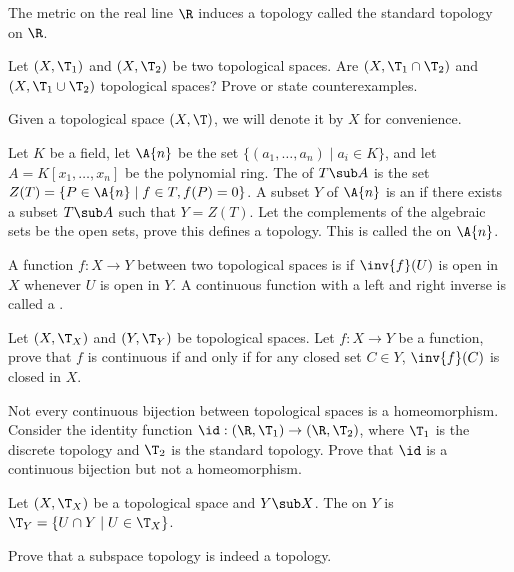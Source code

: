 \documentclass[10pt]{article}
\begin{document}
\par
The metric on the real line $\R$ induces a topology called the standard topology on $\R$.
\begin{problem}
    Let $(X,{\T}_{1})$ and $(X,{\T}_{2})$ be two topological spaces. Are $(X,{\T}_{1}\cap{\T}_{2})$ and $(X,{\T}_{1}\cup{\T}_{2})$ topological spaces? Prove or state counterexamples.
\end{problem}
\begin{remark}
    Given a topological space $(X,\T)$, we will denote it by $X$ for convenience.
\end{remark}
\begin{problem}
    Let $K$ be a field, let $\A{n}$ be the set $\{({a}_{1},\dots,{a}_{n})\mid{a}_{i}\in K\}$, and let $A=K[{x}_{1},\dots,{x}_{n}]$ be the polynomial ring. The  of $T\sub A$ is the set $Z(T)=\{P\in\A{n}\mid f\in T,f(P)=0\}$. A subset $Y$ of $\A{n}$ is an  if there exists a subset $T\sub A$ such that $Y=Z(T)$. Let the complements of the algebraic sets be the open sets, prove this defines a topology. This is called the  on $\A{n}$.
\end{problem}
\begin{definition}
    A function $f:X\to Y$ between two topological spaces is  if $\inv{f}(U)$ is open in $X$ whenever $U$ is open in $Y$. A continuous function with a left and right inverse is called a .
\end{definition}
\begin{problem}
    Let $(X,{\T}_{X})$ and $(Y,{\T}_{Y})$ be topological spaces. Let $f:X\to Y$ be a function, prove that $f$ is continuous if and only if for any closed set $C\in Y$, $\inv{f}(C)$ is closed in $X$.
\end{problem}
\begin{problem}
    Not every continuous bijection between topological spaces is a homeomorphism. Consider the identity function $\id:(\R,{\T}_{1})\to(\R,{\T}_{2})$, where ${\T}_{1}$ is the discrete topology and ${\T}_{2}$ is the standard topology. Prove that $\id$ is a continuous bijection but not a homeomorphism.
\end{problem}
\begin{definition}
    Let $(X,{\T}_{X})$ be a topological space and $Y\sub X$. The  on $Y$ is ${\T}_{Y}=\{U\cap Y\mid U\in{\T}_{X}\}$.
\end{definition}
\begin{problem}
    Prove that a subspace topology is indeed a topology.
\end{problem}
\end{document}
